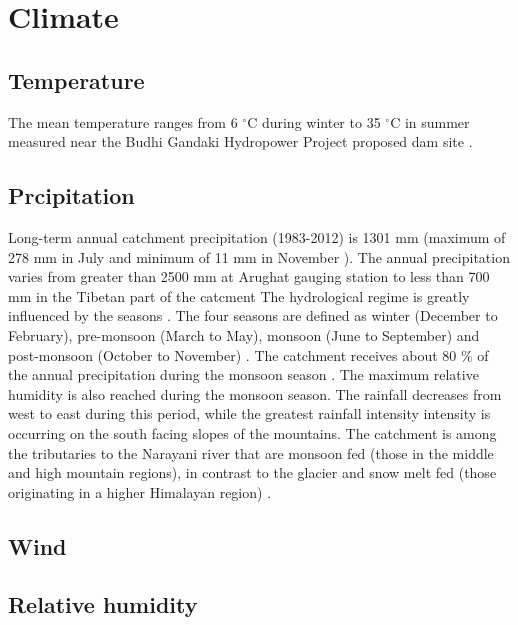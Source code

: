 \section{Climate}

\subsection{Temperature}

The mean temperature ranges from 6 $^{\circ}$C during winter to 35 $^{\circ}$C in summer measured near the Budhi Gandaki Hydropower Project proposed dam site \autocite{devkotaClimateChangeAdaptation2017}. 

\subsection{Prcipitation}
Long-term annual catchment precipitation (1983-2012) is 1301 mm (maximum of 278 mm in July and minimum of 11 mm in November \autocite{marahattaHydrologicalModelingBetter2021}). The annual precipitation varies from greater than 2500 mm at Arughat gauging station to less than 700 mm in the Tibetan part of the catcment \autocite{marahattaHydrologicalModelingBetter2021} The hydrological regime is greatly influenced by the seasons \autocite{bhattaraiEvaluationGlobalForcing2020}. The four seasons are defined as winter (December to February), pre-monsoon (March to May), monsoon (June to September) and post-monsoon (October to November) \autocite{bhattaraiAerosolOpticalDepth2019,shresthaMaximumTemperatureTrends1999}. The catchment receives about 80 $\%$ of the annual precipitation during the monsoon season \autocite{khatriModellingStreamflowSnow2018}. The maximum relative humidity is also reached during the monsoon season. The rainfall decreases from west to east during this period, while the greatest rainfall intensity intensity is occurring on the south facing slopes of the mountains. The catchment is among the tributaries to the Narayani river that are monsoon fed (those in the middle and high mountain regions), in contrast to the glacier and snow melt fed (those originating in a higher Himalayan region) \autocite{bhattaraiEvaluationGlobalForcing2020}.

\subsection{Wind}

\subsection{Relative humidity}

